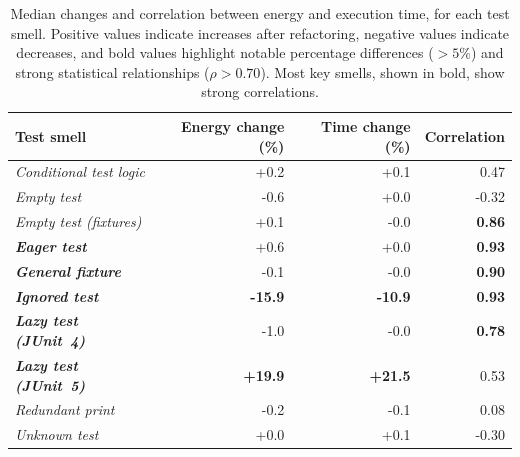 \begin{xltabular}{\linewidth}{l r r r}
    \caption{Median changes and correlation between energy and execution time, for each test smell. Positive values indicate increases after refactoring, negative values indicate decreases, and bold values highlight notable percentage differences (\( > 5 \% \)) and strong statistical relationships (\( \rho > 0.70 \)). Most key smells, shown in bold, show strong correlations.}\label{tab:corr_time} \\[10pt]
    \toprule
    \textbf{Test smell} & \textbf{Energy change (\%)} & \textbf{Time change (\%)} & \textbf{Correlation} \\
    \midrule
    \textit{Conditional test logic} & +0.2 & +0.1 & 0.47 \\
    \textit{Empty test} & -0.6 & +0.0 & -0.32 \\
    \textit{Empty test (fixtures)} & +0.1 & -0.0 & \textbf{0.86} \\
    \textit{\textbf{Eager test}} & +0.6 & +0.0 & \textbf{0.93} \\
    \textit{\textbf{General fixture}} & -0.1 & -0.0 & \textbf{0.90} \\
    \textit{\textbf{Ignored test}} & \textbf{-15.9} & \textbf{-10.9} & \textbf{0.93} \\
    \textit{\textbf{Lazy test (JUnit~4)}} & -1.0 & -0.0 & \textbf{0.78} \\
    \textit{\textbf{Lazy test (JUnit~5)}} & \textbf{+19.9} & \textbf{+21.5} & 0.53 \\
    \textit{Redundant print} & -0.2 & -0.1 & 0.08 \\
    \textit{Unknown test} & +0.0 & +0.1 & -0.30 \\

    \bottomrule
  \end{xltabular}
